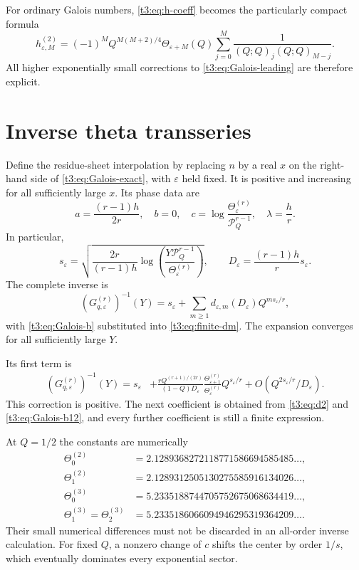 \documentclass[11pt,openany]{book}
\numberwithin{equation}{chapter}
\theoremstyle{plain}
\theoremstyle{definition}
\theoremstyle{remark}
\newcommand{\pp}[1]{(Q;Q)_{#1}}
\newcommand{\Pinf}{\mathcal P_Q}
\newcommand{\eps}{\varepsilon}
\newcommand{\T}{\Theta}
\begin{document}
For ordinary Galois numbers, \eqref{t3:eq:h-coeff} becomes the particularly compact formula
\begin{equation}\label{t3:eq:H-r2}
 h_{\eps,M}^{(2)}=(-1)^M Q^{M(M+2)/4}\T_{\eps+M}(Q)
     \sum_{j=0}^M\frac1{\pp{j}\pp{M-j}}.
\end{equation}
All higher exponentially small corrections to \eqref{t3:eq:Galois-leading} are therefore explicit.

\section{Inverse theta transseries}

Define the residue-sheet interpolation by replacing $n$ by a real $x$ on the right-hand side of \eqref{t3:eq:Galois-exact}, with $\eps$ held fixed. It is positive and increasing for all sufficiently large $x$. Its phase data are
\begin{equation}\label{t3:eq:Galois-phase}
 a=\frac{(r-1)h}{2r},\quad b=0,\quad
 c=\log\frac{\T_{\eps}^{(r)}}{\Pinf^{r-1}},\quad
 \lambda=\frac hr.
\end{equation}
In particular,
\begin{equation}\label{t3:eq:Galois-center}
 s_{\eps}=\sqrt{\frac{2r}{(r-1)h}
       \log\left(\frac{Y\Pinf^{r-1}}{\T_{\eps}^{(r)}}\right)},
 \qquad D_{\eps}=\frac{(r-1)h}{r}s_{\eps}.
\end{equation}
The complete inverse is
\begin{equation}\label{t3:eq:Galois-inverse-full}
 \boxed{\displaystyle
 (G_{q,\eps}^{(r)})^{-1}(Y)
 =s_{\eps}+\sum_{m\ge1}d_{\eps,m}(D_{\eps})Q^{ms_{\eps}/r},}
\end{equation}
with \eqref{t3:eq:Galois-b} substituted into \eqref{t3:eq:finite-dm}. The expansion converges for all sufficiently large $Y$.

Its first term is
\begin{align}\label{t3:eq:Galois-first}
 (G_{q,\eps}^{(r)})^{-1}(Y)=s_{\eps}
 &+\frac{rQ^{(r+1)/(2r)}}{(1-Q)D_{\eps}}
     \frac{\T_{\eps+1}^{(r)}}{\T_{\eps}^{(r)}}
      Q^{s_{\eps}/r}
 +O(Q^{2s_{\eps}/r}/D_{\eps}).
\end{align}
This correction is positive. The next coefficient is obtained from \eqref{t3:eq:d2} and \eqref{t3:eq:Galois-b12}, and every further coefficient is still a finite expression.

At $Q=1/2$ the constants are numerically
\begin{align*}
 \T_0^{(2)}&=2.1289368272118771586694585485\ldots,\\
 \T_1^{(2)}&=2.1289312505130275585916134026\ldots,\\
 \T_0^{(3)}&=5.2335188744705752675068634419\ldots,\\
 \T_1^{(3)}=\T_2^{(3)}&=5.2335186066094946295319364209\ldots.
\end{align*}
Their small numerical differences must not be discarded in an all-order inverse calculation. For fixed $Q$, a nonzero change of $c$ shifts the center by order $1/s$, which eventually dominates every exponential sector.
\end{document}
